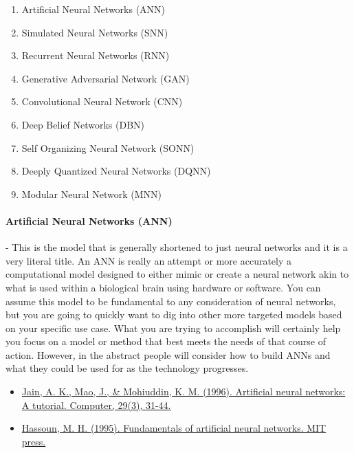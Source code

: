 \documentclass{article}
\begin{document}
\begin{enumerate}
\item Artificial Neural Networks (ANN)
\item Simulated Neural Networks (SNN)
\item Recurrent Neural Networks (RNN)
\item Generative Adversarial Network (GAN) 
\item Convolutional Neural Network (CNN)
\item Deep Belief Networks (DBN)
\item Self Organizing Neural Network (SONN)
\item Deeply Quantized Neural Networks (DQNN)
\item Modular Neural Network (MNN)
\end{enumerate}

\paragraph{Artificial Neural Networks (ANN)} - This is the model that is generally shortened to just neural networks and it is a very literal title. An ANN is really an attempt or more accurately a computational model designed to either mimic or create a neural network akin to what is used within a biological brain using hardware or software. You can assume this model to be fundamental to any consideration of neural networks, but you are going to quickly want to dig into other more targeted models based on your specific use case. What you are trying to accomplish will certainly help you focus on a model or method that best meets the needs of that course of action. However, in the abstract people will consider how to build ANNs and what they could be used for as the technology progresses.

\begin{itemize}
\item \href{https://www.cse.msu.edu/~jain/ArtificialNeuralNetworksATutorial.pdf}{Jain, A. K., Mao, J., \& Mohiuddin, K. M. (1996). Artificial neural networks: A tutorial. Computer, 29(3), 31-44.} \cite{jain1996artificial}
\item \href{https://www.researchgate.net/profile/Terrence-Fine/publication/3078997_Fundamentals_of_Artificial_Neural_Networks-Book_Reviews/links/56ebf73a08aee4707a3849a6/Fundamentals-of-Artificial-Neural-Networks-Book-Reviews.pdf}{Hassoun, M. H. (1995). Fundamentals of artificial neural networks. MIT press.} \cite{hassoun1995fundamentals}
\end{itemize}
\end{document}
